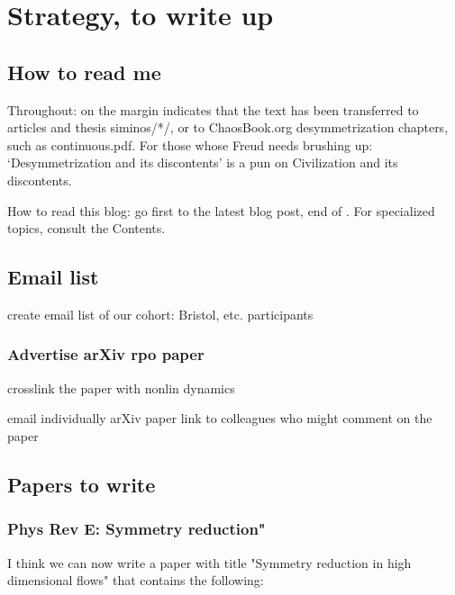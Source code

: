 
\chapter{Strategy, to write up}

\section{How to read me}

Throughout:  {\textdollar} on the margin
{\steady}
indicates that the text has been transferred to
articles and thesis siminos/*/,  or to ChaosBook.org desymmetrization
chapters, such as
{continuous.pdf}.
%
For those whose Freud needs brushing up:
`Desymmetrization and its discontents' is a pun
on 
{Civilization and its discontents}.

How to read this blog: go first to the latest blog post, end
of . For specialized topics, consult the
Contents.


\section{Email list}

create email list of our cohort:  Bristol, etc. participants

\subsection{Advertise arXiv rpo paper}

crosslink the paper with nonlin dynamics

email individually arXiv paper link to colleagues who might comment
    on the paper



\section{Papers to write}

\subsection{Phys Rev E: Symmetry reduction"}

\medskip{}
I think we can now write a paper with title "Symmetry
reduction in high dimensional flows" that contains the
following:

